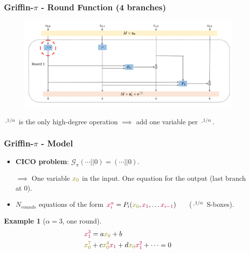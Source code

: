 \documentclass[aspectratio=169]{beamer}
\newtheorem{exemple}{Example}
\begin{document}
\begin{frame}
  \frametitle{Griffin-$\pi$ - Round Function (4 branches)}
  \begin{figure}
    \centering
    \includegraphics[width=.9\textwidth]{./figures/griffin-round-inv.png}
  \end{figure}

  \begin{center}
    \textcolor{myred}{$\cdot^{1/\alpha}$ is the only high-degree operation} $\implies$ add one variable per $\cdot^{1/\alpha}$. 
  \end{center}
\end{frame}




\begin{frame}
  \frametitle{Griffin-$\pi$ - Model}
  \begin{itemize}
  \item \textbf{CICO problem}: $\mathcal{G}_\pi(\cdots || 0) = (\cdots || 0)$.

    $\implies$ One variable $\textcolor{olive}{x_0}$ in the input. One equation for the output (last branch at 0).
  \item $N_{rounds}$ equations of the form $\textcolor{purple}{x_i^\alpha} = P_i(\textcolor{olive}{x_0}, \textcolor{purple}{x_1}, \ldots \textcolor{purple}{x_{i-1}})$ $\quad$ ($\cdot^{1/\alpha}$ S-boxes).
  \end{itemize}

  \pause
  \begin{exemple}[$\alpha = 3$, one round]
    \vspace{-20pt}
    \begin{align*}
      &\textcolor{purple}{x_1^3} = a\textcolor{olive}{x_0} + b \\
      &\textcolor{olive}{x_0^7} + c\textcolor{olive}{x_0^4}\textcolor{purple}{x_1} + d\textcolor{olive}{x_0}\textcolor{purple}{x_1^2} + \cdots = 0
    \end{align*}

  \end{exemple}
\end{frame}
\end{document}

